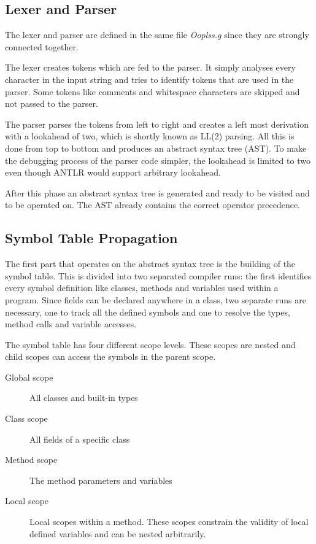 \subsection{Lexer and Parser}
The lexer and parser are defined in the same file \emph{Ooplss.g}
since they are strongly connected together.

The lexer creates tokens which are fed to the parser. It simply
analyses every character in the input string and tries to identify tokens
that are used in the parser. Some tokens like comments and whitespace characters
are skipped and not passed to the parser.

The parser parses the tokens from left to right and creates a left most
derivation with a lookahead of two, which is shortly known as LL(2) parsing.
All this is done from top to bottom and produces an
abstract syntax tree (AST). To make the debugging process of the parser code simpler,
the lookahead is limited to two even though ANTLR would support arbitrary
lookahead.

After this phase an abstract syntax tree is generated and ready to be visited
and to be operated on. The AST already contains the correct operator precedence.

\subsection{Symbol Table Propagation}
The first part that operates on the abstract syntax tree is the building of
the symbol table. This is divided into two separated compiler runs: the
first identifies every symbol definition like classes, methods and
variables used within a program. Since fields can be declared anywhere
in a class, two separate runs are necessary, one to track all the defined
symbols and one to resolve the types, method calls and variable accesses.

The symbol table has four different scope levels. These scopes are nested
and child scopes can access the symbols in the parent scope.
\begin{description}
	\item[Global scope] All classes and built-in types
	\item[Class scope] All fields of a specific class
	\item[Method scope] The method parameters and variables
	\item[Local scope] Local scopes within a method. These scopes
	constrain the validity of local defined variables and can be
	nested arbitrarily.
\end{description}

